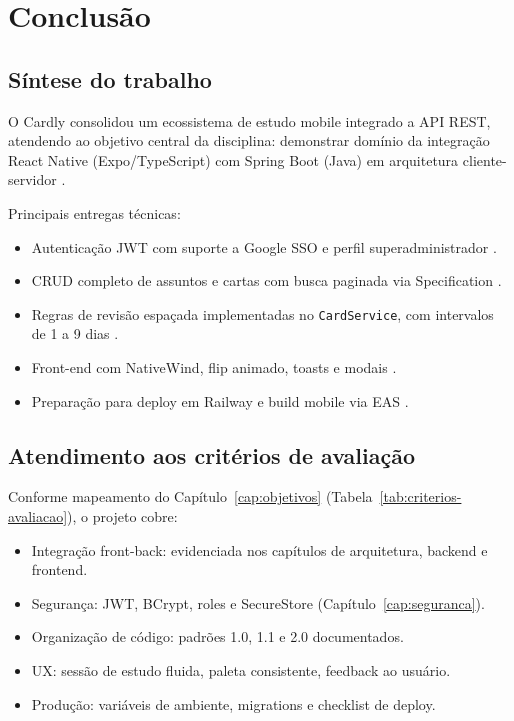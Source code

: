 \chapter{Conclusão}
\label{cap:conclusao}

\section{Síntese do trabalho}

O Cardly consolidou um ecossistema de estudo mobile integrado a API REST, atendendo ao objetivo central da disciplina: demonstrar domínio da integração React Native (Expo/TypeScript) com Spring Boot (Java) em arquitetura cliente-servidor \cite{react_native_docs,spring_boot_docs,tanenbaum2015}.

Principais entregas técnicas:
\begin{itemize}
    \item Autenticação JWT com suporte a Google SSO e perfil superadministrador \cite{jwt_io,google_oauth}.
    \item CRUD completo de assuntos e cartas com busca paginada via Specification \cite{jpa_specification}.
    \item Regras de revisão espaçada implementadas no \texttt{CardService}, com intervalos de 1 a 9 dias \cite{anki_manual,medium_spaced_repetition}.
    \item Front-end com NativeWind, flip animado, toasts e modais \cite{nativewind_docs,w3schools_flip}.
    \item Preparação para deploy em Railway e build mobile via EAS \cite{railway_docs,expo_eas_build}.
\end{itemize}

\section{Atendimento aos critérios de avaliação}

Conforme mapeamento do Capítulo~\ref{cap:objetivos} (Tabela~\ref{tab:criterios-avaliacao}), o projeto cobre:
\begin{itemize}
    \item Integração front-back: evidenciada nos capítulos de arquitetura, backend e frontend.
    \item Segurança: JWT, BCrypt, roles e SecureStore (Capítulo~\ref{cap:seguranca}).
    \item Organização de código: padrões 1.0, 1.1 e 2.0 documentados.
    \item UX: sessão de estudo fluida, paleta consistente, feedback ao usuário.
    \item Produção: variáveis de ambiente, migrations e checklist de deploy.
\end{itemize}

